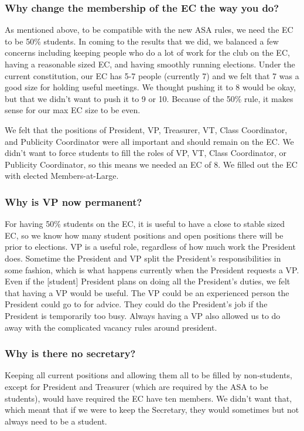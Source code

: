 \documentclass{article}
\begin{document}
\subsubsection*{Why change the membership of the EC the way you do?}
As mentioned above, to be compatible with the new ASA rules, we need the EC to be 50\% students. In coming to the results that we did, we balanced a few concerns including keeping people who do a lot of work for the club on the EC, having a reasonable sized EC, and having smoothly running elections. Under the current constitution, our EC has 5-7 people (currently 7) and we felt that 7 was a good size for holding useful meetings. We thought pushing it to 8 would be okay, but that we didn't want to push it to 9 or 10. Because of the 50\% rule, it makes sense for our max EC size to be even.

We felt that the positions of President, VP, Treasurer, VT, Class Coordinator, and Publicity Coordinator were all important and should remain on the EC. We didn't want to force students to fill the roles of VP, VT, Class Coordinator, or Publicity Coordinator, so this means we needed an EC of 8. We filled out the EC with elected  Members-at-Large.

\subsubsection*{Why is VP now permanent?}
For having 50\% students on the EC, it is useful to have a close to stable sized EC, so we know how many student positions and open positions there will be prior to elections. VP is a useful role, regardless of how much work the President does. Sometime the President and VP split the President's responsibilities in some fashion, which is what happens currently when the President requests a VP. Even if the [student] President plans on doing all the President's duties, we felt that having a  VP would be useful. The VP could be an experienced person the President could go to for advice. They could do the President's job if the President is temporarily too busy. Always having a VP also allowed us to do away with the complicated vacancy rules around president.

\subsubsection*{Why is there no secretary?}
Keeping all current positions and allowing them all to be filled by non-students, except for President and Treasurer (which are required by the ASA to be students), would have required the EC have ten members. We didn't want that, which meant that if we were to keep the Secretary, they would sometimes but not always need to be a student.
\end{document}
